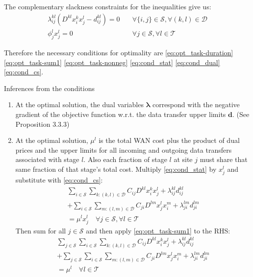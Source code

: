 The complementary slackness constraints for the inequalities give us:
\begin{subequations}\label{eq:cond_cs}
	\begin{align}
		\lambda_{ij}^{kl}\left(D^{kl}x_i^kx_j^l - d_{ij}^{kl}\right) = 0 & \quad \forall\{i,j\}\in\mathcal{S}, \forall(k,l)\in\mathcal{D} \label{eq:cond_cs_duration} \\
		\phi_j^lx_j^l = 0 & \quad \forall j\in\mathcal{S},\forall l\in\mathcal{T} \label{eq:cond_cs_nonneg}
	\end{align}
\end{subequations}

Therefore the necessary conditions for optimality are \eqref{eq:opt_task-duration} \eqref{eq:opt_task-sum1} \eqref{eq:opt_task-nonneg} \eqref{eq:cond_stat} \eqref{eq:cond_dual} \eqref{eq:cond_cs}.

Inferences from the conditions
\begin{enumerate}
	\item At the optimal solution, the dual variables $\boldsymbol{\lambda}$ correspond with the negative gradient of the objective function w.r.t. the data transfer upper limits $\mathbf{d}$. (See \cite{bertsekas1999nonlinear} Proposition 3.3.3)
	\item At the optimal solution, $\mu^l$ is the total WAN cost plus the product of dual prices and the upper limits for all incoming and outgoing data transfers associated with stage $l$.
	Also each fraction of stage $l$ at site $j$ must share that same fraction of that stage's total cost. 
	Multiply \eqref{eq:cond_stat} by $x_j^l$ and substitute with \eqref{eq:cond_cs}:
	\begin{align}
		\sum_{i\in\mathcal{S}}\sum_{k:(k,l)\in\mathcal{D}} C_{ij}D^{kl}x_i^kx_j^l + \lambda_{ij}^{kl}d_{ij}^{kl} \nonumber \\
		+ \sum_{i\in\mathcal{S}}\sum_{m:(l,m)\in\mathcal{D}} C_{ji}D^{lm}x_j^lx_i^m+ \lambda_{ji}^{lm}d_{ji}^{lm} \nonumber \\
		= \mu^lx_j^l
		\quad \forall j\in\mathcal{S},\forall l\in\mathcal{T}
	\end{align}
	Then sum for all $j\in\mathcal{S}$ and then apply \eqref{eq:opt_task-sum1} to the RHS:
	\begin{align}
		\sum_{j\in\mathcal{S}}\sum_{i\in\mathcal{S}}\sum_{k:(k,l)\in\mathcal{D}} C_{ij}D^{kl}x_i^kx_j^l + \lambda_{ij}^{kl}d_{ij}^{kl} \nonumber \\
		+ \sum_{j\in\mathcal{S}}\sum_{i\in\mathcal{S}}\sum_{m:(l,m)\in\mathcal{D}} C_{ji}D^{lm}x_j^lx_i^m+ \lambda_{ji}^{lm}d_{ji}^{lm} \nonumber \\
		= \mu^l
		\quad \forall l\in\mathcal{T}
	\end{align}
\end{enumerate}

